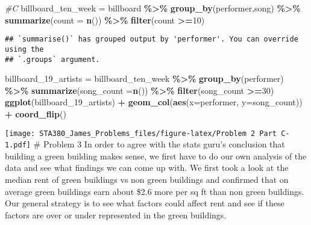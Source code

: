 \documentclass[
]{article}
\newenvironment{Shaded}{\begin{snugshade}}{\end{snugshade}}
\newcommand{\AttributeTok}[1]{\textcolor[rgb]{0.13,0.29,0.53}{#1}}
\newcommand{\CommentTok}[1]{\textcolor[rgb]{0.56,0.35,0.01}{\textit{#1}}}
\newcommand{\DecValTok}[1]{\textcolor[rgb]{0.00,0.00,0.81}{#1}}
\newcommand{\FunctionTok}[1]{\textcolor[rgb]{0.13,0.29,0.53}{\textbf{#1}}}
\newcommand{\NormalTok}[1]{#1}
\newcommand{\OtherTok}[1]{\textcolor[rgb]{0.56,0.35,0.01}{#1}}
\newcommand{\SpecialCharTok}[1]{\textcolor[rgb]{0.81,0.36,0.00}{\textbf{#1}}}
\begin{document}
\begin{Shaded}
\begin{Highlighting}[]
\CommentTok{\#C}
\NormalTok{billboard\_ten\_week }\OtherTok{=}\NormalTok{ billboard }\SpecialCharTok{\%\textgreater{}\%} \FunctionTok{group\_by}\NormalTok{(performer,song) }\SpecialCharTok{\%\textgreater{}\%} 
  \FunctionTok{summarize}\NormalTok{(}\AttributeTok{count =} \FunctionTok{n}\NormalTok{()) }\SpecialCharTok{\%\textgreater{}\%}
  \FunctionTok{filter}\NormalTok{(count }\SpecialCharTok{\textgreater{}=}\DecValTok{10}\NormalTok{)}
\end{Highlighting}
\end{Shaded}

\begin{verbatim}
## `summarise()` has grouped output by 'performer'. You can override using the
## `.groups` argument.
\end{verbatim}

\begin{Shaded}
\begin{Highlighting}[]
\NormalTok{billboard\_19\_artists }\OtherTok{=}\NormalTok{ billboard\_ten\_week }\SpecialCharTok{\%\textgreater{}\%} \FunctionTok{group\_by}\NormalTok{(performer) }\SpecialCharTok{\%\textgreater{}\%} 
  \FunctionTok{summarize}\NormalTok{(}\AttributeTok{song\_count =}\FunctionTok{n}\NormalTok{()) }\SpecialCharTok{\%\textgreater{}\%} \FunctionTok{filter}\NormalTok{(song\_count }\SpecialCharTok{\textgreater{}=}\DecValTok{30}\NormalTok{)}
\FunctionTok{ggplot}\NormalTok{(billboard\_19\_artists) }\SpecialCharTok{+} \FunctionTok{geom\_col}\NormalTok{(}\FunctionTok{aes}\NormalTok{(}\AttributeTok{x=}\NormalTok{performer, }\AttributeTok{y=}\NormalTok{song\_count)) }\SpecialCharTok{+} 
  \FunctionTok{coord\_flip}\NormalTok{()}
\end{Highlighting}
\end{Shaded}

\texttt{[image: STA380\_James\_Problems\_files/figure-latex/Problem 2 Part C-1.pdf]}
\# Problem 3 In order to agree with the stats guru's conclusion that
building a green building makes sense, we first have to do our own
analysis of the data and see what findings we can come up with. We first
took a look at the median rent of green buildings vs non green buildings
and confirmed that on average green buildings earn about \$2.6 more per
sq ft than non green buildings. Our general strategy is to see what
factors could affect rent and see if these factors are over or under
represented in the green buildings.
\end{document}
